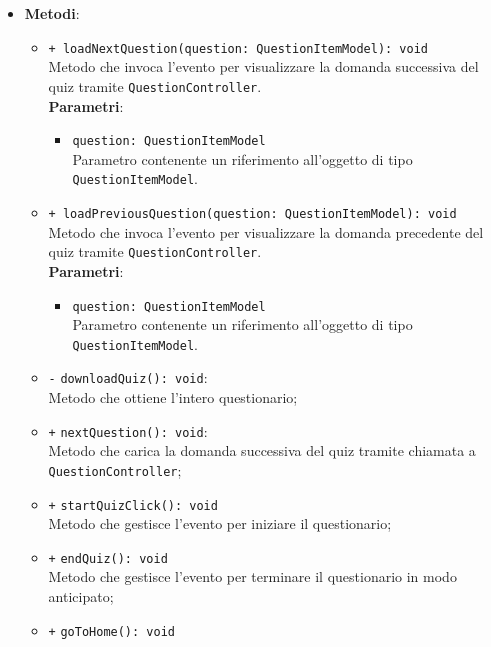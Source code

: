 \begin{itemize}
\begin{itemize}
\begin{itemize}
			\end{itemize}	
		\end{itemize}
		\item \textbf{Metodi}: 
		\begin{itemize}
			\item \texttt{+ loadNextQuestion(question: QuestionItemModel): void}\\
			Metodo che invoca l'evento per visualizzare la domanda successiva del quiz tramite \texttt{QuestionController}. \\
			\textbf{Parametri}:
			\begin{itemize}
				\item \texttt{question: QuestionItemModel} \\
				Parametro contenente un riferimento all'oggetto di tipo \texttt{QuestionItemModel}.
			\end{itemize}
			\item \texttt{+ loadPreviousQuestion(question: QuestionItemModel): void} \\
			Metodo che invoca l'evento per visualizzare la domanda precedente del quiz tramite \texttt{QuestionController}. \\
			\textbf{Parametri}:
			\begin{itemize}
				\item \texttt{question: QuestionItemModel} \\
				Parametro contenente un riferimento all'oggetto di tipo \texttt{QuestionItemModel}.
			\end{itemize}
			\item \texttt{-} \texttt{downloadQuiz(): void}: \\ Metodo che ottiene l'intero questionario; \\
			\item \texttt{+} \texttt{nextQuestion(): void}: \\ Metodo che carica la domanda successiva del quiz tramite chiamata a \texttt{QuestionController}; \\
			\item \texttt{+} \texttt{startQuizClick(): void} \\
			Metodo che gestisce l'evento per iniziare il questionario;
			\item \texttt{+} \texttt{endQuiz(): void} \\
			Metodo che gestisce l'evento per terminare il questionario in modo anticipato;
			\item \texttt{+} \texttt{goToHome(): void} \\

\end{itemize}
\end{itemize}
